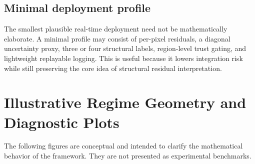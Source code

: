 \documentclass[11pt]{article}
\theoremstyle{definition}
\theoremstyle{plain}
\begin{document}
\subsection{Minimal deployment profile}
The smallest plausible real-time deployment need not be mathematically elaborate. A minimal profile may consist of per-pixel residuals, a diagonal uncertainty proxy, three or four structural labels, region-level trust gating, and lightweight replayable logging. This is useful because it lowers integration risk while still preserving the core idea of structural residual interpretation.

\section{Illustrative Regime Geometry and Diagnostic Plots}

The following figures are conceptual and intended to clarify the mathematical behavior of the framework. They are not presented as experimental benchmarks.
\end{document}
